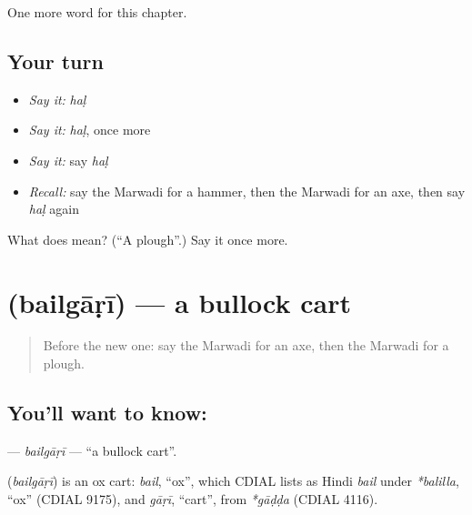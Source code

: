 \begin{grammarlens}[title={What you've built}]
One more word for this chapter.
\end{grammarlens}

\subsection*{Your turn}
\begin{itemize}
\raggedright
  \item \emph{Say it:} \emph{haḷ}
  \item \emph{Say it:} \emph{haḷ}, once more
  \item \emph{Say it:} say \emph{haḷ}
  \item \emph{Recall:} say the Marwadi for a hammer, then the Marwadi for an axe, then say \emph{haḷ} again
\end{itemize}

\begin{tcolorbox}[breakable,colback=teal!4,colframe=teal!35!black,title={Before you move on}]
What does  mean? (\textquotedblleft{}A plough\textquotedblright{}.) Say it once more.
\end{tcolorbox}
\section[\texorpdfstring{\mw{बैलगाड़ी} (bailgāṛī)}{बैलगाड़ी (bailgāṛī)}]{ (bailgāṛī) — a bullock cart}

\label{lesson:MW-C127-bailgari}



\begin{quote}
Before the new one: say the Marwadi for an axe, then the Marwadi for a plough.
\end{quote}

\subsection*{You'll want to know: }
\textbf{} — \emph{bailgāṛī} — \textquotedblleft{}a bullock cart\textquotedblright{}.

\begin{cousinweb}
\textbf{} (\emph{bailgāṛī}) is an ox cart: \emph{bail}, \textquotedblleft{}ox\textquotedblright{}, which CDIAL lists as Hindi \emph{bail} under \emph{*balilla}, \textquotedblleft{}ox\textquotedblright{} (CDIAL 9175), and \emph{gāṛī}, \textquotedblleft{}cart\textquotedblright{}, from \emph{*gāḍḍa} (CDIAL 4116).
\end{cousinweb}

